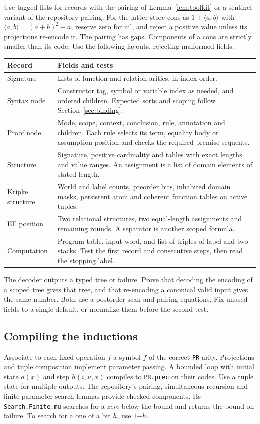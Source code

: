 Use tagged lists for records with the pairing of Lemma~\ref{lem:toolkit} or a sentinel variant of the repository pairing. For the latter store cons as $1+\langle a,b\rangle$ with $\langle a,b\rangle=(a+b)^2+a$, reserve zero for nil, and reject a positive value unless its projections re-encode it. The pairing has gaps. Components of a cons are strictly smaller than its code. Use the following layouts, rejecting malformed fields.
\begin{center}\small
\begin{tabularx}{\linewidth}{@{}lX@{}}\toprule
Record & Fields and tests \\ \midrule
Signature & Lists of function and relation arities, in index order.\\
Syntax node & Constructor tag, symbol or variable index as needed, and ordered children. Expected sorts and scoping follow Section~\ref{sec:binding}.\\
Proof node & Mode, scope, context, conclusion, rule, annotation and children. Each rule selects its term, equality body or assumption position and checks the required premise sequents.\\
Structure & Signature, positive cardinality and tables with exact lengths and value ranges. An assignment is a list of domain elements of stated length.\\
Kripke structure & World and label counts, preorder bits, inhabited domain masks, persistent atom and coherent function tables on active tuples.\\
EF position & Two relational structures, two equal-length assignments and remaining rounds. A separator is another scoped formula.\\
Computation & Program table, input word, and list of triples of label and two stacks. Test the first record and consecutive steps, then read the stopping label.\\
\bottomrule\end{tabularx}\end{center}
The decoder outputs a typed tree or failure. Prove that decoding the encoding of a scoped tree gives that tree, and that re-encoding a canonical valid input gives the same number. Both use a postorder scan and pairing equations. Fix unused fields to a single default, or normalize them before the second test.

\subsection{Compiling the inductions}
Associate to each fixed operation $f$ a symbol $\widehat f$ of the correct \texttt{PR} arity. Projections and tuple composition implement parameter passing. A bounded loop with initial state $a(\bar x)$ and step $h(i,u,\bar x)$ compiles to \texttt{PR.prec} on their codes. Use a tuple state for multiple outputs. The repository's pairing, simultaneous recursion and finite-parameter search lemmas provide checked components. Its \texttt{Search.Finite.mu} searches for a \emph{zero} below the bound and returns the bound on failure. To search for a one of a bit $h$, use $1\mathbin{\dot-}h$.


